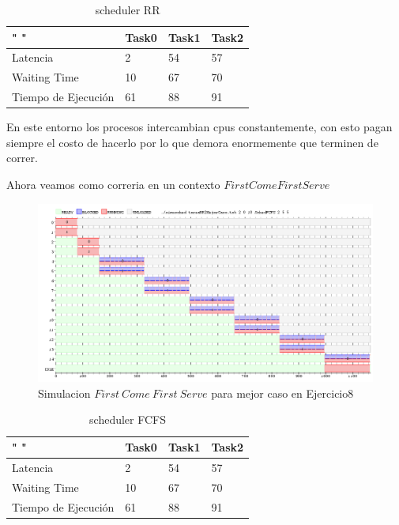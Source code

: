 \documentclass[11pt]{article}
\begin{document}
  \begin{table}[htb]
  \centering
  \begin{tabular}{| l | l | l | l |}
  \hline
  " " & Task0 & Task1 & Task2 \\
  \hline \hline
  Latencia & 2 & 54 & 57 \\ \hline
  Waiting Time & 10 & 67 & 70 \\ \hline
  Tiempo de Ejecución & 61 & 88 & 91 \\ \hline
  \end{tabular}
  \caption{scheduler RR}
  \end{table}

En este entorno los procesos intercambian cpus constantemente, con esto pagan siempre el costo de hacerlo por lo que demora enormemente que terminen de correr.

Ahora veamos como correria en un contexto $FirstComeFirstServe$


  \begin{figure}[H]
    \includegraphics[scale=0.5]{Ej8MejorCasoFCFS}
    \caption{Simulacion $First\ Come\ First\ Serve$ para mejor caso en Ejercicio8}
  \end{figure}

  \begin{table}[htb]
  \centering
  \begin{tabular}{| l | l | l | l |}
  \hline
  " " & Task0 & Task1 & Task2 \\
  \hline \hline
  Latencia & 2 & 54 & 57 \\ \hline
  Waiting Time & 10 & 67 & 70 \\ \hline
  Tiempo de Ejecución & 61 & 88 & 91 \\ \hline
  \end{tabular}
  \caption{scheduler FCFS}
  \end{table}
\end{document}
